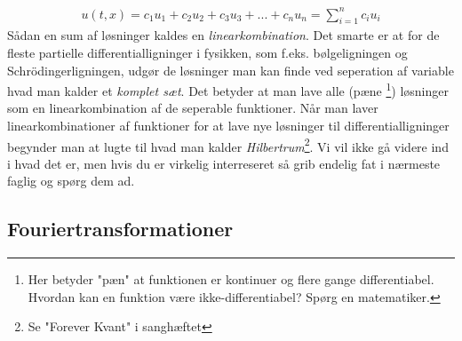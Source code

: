 \documentclass[crop=false, class=memoir]{standalone}
\begin{document}
\begin{align}
    u(t,x) = c_1 u_1 + c_2 u_2 + c_3 u_3 + ... + c_n u_n = \sum_{i = 1}^n c_i u_i
\end{align}
Sådan en sum af løsninger kaldes en \emph{linearkombination}. Det smarte er at for de fleste partielle differentialligninger i fysikken, som f.eks. bølgeligningen og Schrödingerligningen, udgør de løsninger man kan finde ved seperation af variable hvad man kalder et \emph{komplet sæt}. Det betyder at man lave alle (pæne \footnote{Her betyder "pæn" at funktionen er kontinuer og flere gange differentiabel. Hvordan kan en funktion være ikke-differentiabel? Spørg en matematiker.}) løsninger som en linearkombination af de seperable funktioner. Når man laver linearkombinationer af funktioner for at lave nye løsninger til differentialligninger begynder man at lugte til hvad man kalder \emph{Hilbertrum}\footnote{Se "Forever Kvant" i sanghæftet}. Vi vil ikke gå videre ind i hvad det er, men hvis du er virkelig interreseret så grib endelig fat i nærmeste faglig og spørg dem ad.

\subsection{Fouriertransformationer}
\end{document}
